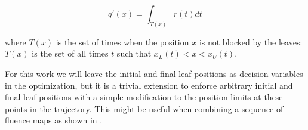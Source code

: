 \begin{equation}
q'(x) = \int_{T(x)} r(t) dt
\label{eqn:deliveredFluenceDose}
\end{equation}

where $T(x)$ is the set of times when the position $x$ is not blocked by the leaves:
$T(x)$ is the set of all times $t$ such that $ x_L(t) < x < x_U(t)$.

For this work we will leave the initial and final leaf positions as decision variables
in the optimization, but it is a trivial extension to enforce arbitrary initial and final
leaf positions with a simple modification to the position limits at these points in the
trajectory. This might be useful when combining a sequence of fluence maps as shown in
.

